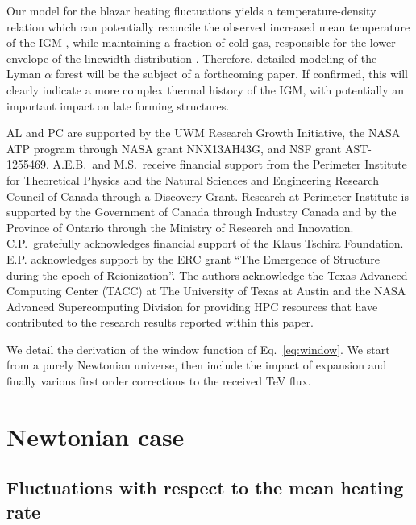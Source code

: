 \documentclass[numberedappendix]{emulateapj}
\begin{document}
Our model for the blazar heating fluctuations yields a temperature-density relation which can potentially reconcile the observed increased mean temperature of the IGM \citep{2014MNRAS.441.1916B}, while maintaining a fraction of cold gas, responsible for the lower envelope of the linewidth distribution \citep{2012ApJ...757L..30R}. Therefore, detailed modeling of the Lyman $\alpha$ forest will be the subject of a forthcoming paper. If confirmed, this will clearly indicate a more complex thermal history of the IGM, with potentially an important impact on late forming structures.
\begin{acknowledgements}
AL and PC are supported by the UWM Research Growth Initiative, the NASA ATP
program through NASA grant NNX13AH43G, and NSF grant AST-1255469.
A.E.B.~and M.S.~receive financial support from the Perimeter
Institute for Theoretical Physics and the Natural Sciences and
Engineering Research Council of Canada through a Discovery Grant.
Research at Perimeter Institute is supported by the Government of
Canada through Industry Canada and by the Province of Ontario through
the Ministry of Research and Innovation.
C.P.~gratefully acknowledges
financial support of the Klaus Tschira Foundation. E.P. acknowledges support by the ERC grant ``The Emergence of Structure during the epoch of Reionization''.
The authors acknowledge the Texas Advanced Computing Center (TACC) at The University of Texas at Austin and the NASA Advanced Supercomputing Division for providing HPC resources that have contributed to the research results reported within this paper.
\end{acknowledgements}
\appendix
We detail the derivation of the window function of Eq.~\eqref{eq:window}. We start from a purely Newtonian universe, then include the impact of expansion and finally various first order corrections to the received TeV flux.\\

\section {Newtonian case}\label{sec:windon_newt}
\subsection {Fluctuations with respect to the mean heating rate}
\end{document}
